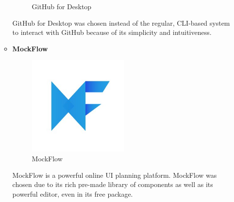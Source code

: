 \documentclass[conference]{IEEEtran}
\begin{document}
\begin{enumerate}
\begin{itemize}
\begin{figure}[H]
            \caption{GitHub for Desktop}
            \label{githubdesktop-logo}
        \end{figure}
        GitHub for Desktop was chosen instead of the regular, CLI-based system to interact with GitHub because of its simplicity and intuitiveness.
        \newline
        \item \textbf{MockFlow} 
        \begin{figure}[H]
            \centerline{\includegraphics[width=50mm,scale=0.5]{img/logo/logo-mockflow.jpg}}
            \caption{MockFlow}
            \label{mockflow-logo}
        \end{figure}
        MockFlow is a powerful online UI planning platform. MockFlow was chosen due to its rich pre-made library of components as well as its powerful editor, even in its free package.
    \end{itemize}
\end{enumerate}
\end{document}
